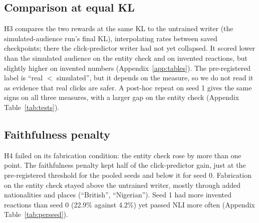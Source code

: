 \begin{table}[t]
\centering\small
{}
\caption{Final checkpoints on 1,000 test articles (4 headlines each; both seeds pooled). Rates are percentages of headlines; Words is mean headline length. The last two columns are each reward's score, standardised on the untrained writer. Per-seed values and confidence intervals are in Appendix~\ref{app:tables}.}
\label{tab:final}
\end{table}

\subsection{Comparison at equal KL}
H3 compares the two rewards at the same KL to the untrained writer (the simulated-audience run's final KL), interpolating rates between saved checkpoints; there the click-predictor writer had not yet collapsed. It scored lower than the simulated audience on the entity check and on invented reactions, but slightly higher on invented numbers (Appendix~\ref{app:tables}). The pre-registered label is ``real $<$ simulated'', but it depends on the measure, so we do not read it as evidence that real clicks are safer. A post-hoc repeat on seed 1 gives the same signs on all three measures, with a larger gap on the entity check (Appendix Table~\ref{tab:tests}).

\subsection{Faithfulness penalty}
H4 failed on its fabrication condition: the entity check rose by more than one point. The faithfulness penalty kept half of the click-predictor gain, just at the pre-registered threshold for the pooled seeds and below it for seed 0. Fabrication on the entity check stayed above the untrained writer, mostly through added nationalities and places (``British'', ``Nigerian''). Seed 1 had more invented reactions than seed 0 (22.9\% against 4.2\%) yet passed NLI more often (Appendix Table~\ref{tab:perseed}).

